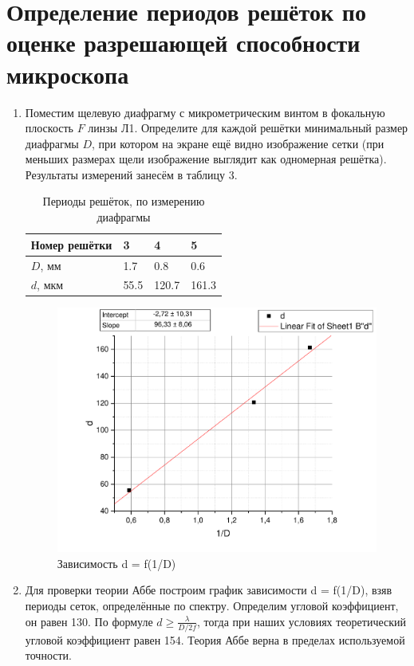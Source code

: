 \documentclass[12pt]{article}
\begin{document}
\section{Определение периодов решёток по оценке разрешающей способности микроскопа}
\begin{enumerate}
    \item Поместим щелевую диафрагму с микрометрическим винтом в фокальную плоскость $F$ линзы Л1. Определите для каждой решётки минимальный размер диафрагмы $D$, при котором на экране ещё видно изображение сетки (при меньших размерах щели изображение выглядит
как одномерная решётка). Результаты измерений занесём в таблицу 3.

        \begin{table}[h]
    \centering
    \begin{center}
    \caption{Периоды решёток, по измерению диафрагмы}
    \end{center}
    \vspace{0.1cm}
    \label{tab:my_label}
    \begin{tabular}{ |p{3 cm}||p{1cm}|p{1cm}|p{1cm}|}
 \hline
Номер решётки &  3 & 4 & 5\\
 \hline
 $D$, мм  & 1.7 & 0.8 & 0.6 \\
 \hline
 $d$, мкм  & 55.5 & 120.7 & 161.3 \\

 \hline
 
\end{tabular}
\end{table}

    \begin{figure}[h]
    \centering
    \includegraphics[width=13cm]{fig3.pdf}
    \caption{Зависимость d = f(1/D)}
    \label{fig:vac}
\end{figure}

\item Для проверки теории Аббе построим график зависимости d = f(1/D), взяв периоды сеток, определённые по спектру. Определим угловой коэффициент, он равен 130. По формуле $d \ge \frac{\lambda}{D/2f}$, тогда при наших условиях теоретический угловой коэффициент равен 154. Теория Аббе верна в пределах используемой точности.

\end{enumerate}
\end{document}
